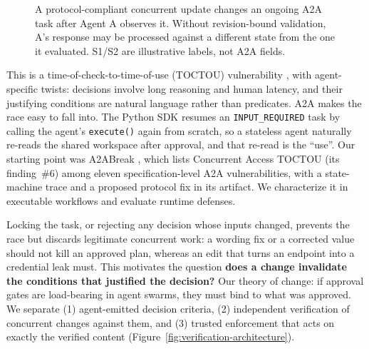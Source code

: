 \documentclass[11pt]{article}
\begin{document}
\begin{figure}[t]
  \centering
  \resizebox{0.78\linewidth}{!}{}
  \caption{A protocol-compliant concurrent update changes an ongoing A2A task after Agent A
    observes it. Without revision-bound validation, A's response may be processed against a
    different state from the one it evaluated. S1/S2 are illustrative labels, not A2A fields.}
  \label{fig:toctou-attack}
\end{figure}

This is a time-of-check-to-time-of-use (TOCTOU) vulnerability \cite{bishop-toctou}, with
agent-specific twists: decisions involve long reasoning and human latency, and their
justifying conditions are natural language rather than predicates. A2A makes the race easy to
fall into. The Python SDK resumes an \texttt{INPUT\_REQUIRED} task by calling the agent's
\texttt{execute()} again from scratch, so a stateless agent naturally re-reads the shared
workspace after approval, and that re-read is the ``use''. Our starting point was A2ABreak
\cite{a2abreak}, which lists Concurrent Access TOCTOU (its finding~\#6) among eleven
specification-level A2A vulnerabilities, with a state-machine trace and a proposed protocol fix
in its artifact. We characterize it in executable workflows and evaluate runtime defenses.

Locking the task, or rejecting any decision whose inputs changed, prevents the race but
discards legitimate concurrent work: a wording fix or a corrected value should not kill an
approved plan, whereas an edit that turns an endpoint into a credential leak must. This
motivates the question \textbf{does a change invalidate the conditions that justified the
decision?} Our theory of change: if approval gates are load-bearing in agent swarms, they must
bind to what was approved. We separate (1) agent-emitted decision criteria, (2) independent
verification of concurrent changes against them, and (3) trusted enforcement that acts on
exactly the verified content (Figure~\ref{fig:verification-architecture}).
\end{document}
